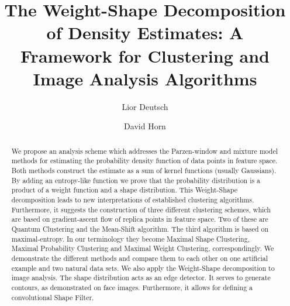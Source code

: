 \documentclass[preprint,12pt]{elsarticle}
\begin{document}
\begin{frontmatter}



\title{The Weight-Shape Decomposition of Density Estimates: A Framework for Clustering and Image Analysis Algorithms}


\author[tau]{Lior Deutsch}
\author[tau]{David Horn}

\address[tau]{Tel Aviv University, Tel Aviv, Israel}

\begin{abstract}
We propose an analysis scheme which addresses the Parzen-window and mixture model methods for estimating the probability density function of data points in feature space. Both methods construct the estimate as a sum of kernel functions (usually Gaussians). By adding an entropy-like function we prove that the probability distribution is a product of a weight function and a shape distribution. This Weight-Shape decomposition leads to new interpretations of established clustering algorithms. Furthermore, it suggests the construction of three different clustering schemes, which are based on gradient-ascent flow of replica points in feature space. Two of these are Quantum Clustering and the Mean-Shift algorithm. The third algorithm is based on maximal-entropy. In our terminology they become Maximal Shape Clustering, Maximal Probability Clustering and Maximal Weight Clustering, correspondingly. We demonstrate the different methods and compare them to each other on one artificial example and two natural data sets. We also apply the Weight-Shape decomposition to image analysis. The shape distribution acts as an edge detector. It serves to generate contours, as demonstrated on face images. Furthermore, it allows for defining a convolutional Shape Filter.


\end{abstract}
\end{frontmatter}
\end{document}
